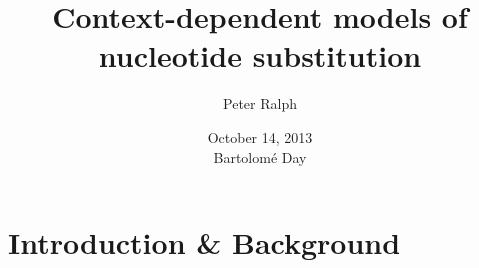 \documentclass[smaller]{beamer}
\title[Context-dependent models] %
{Context-dependent models of nucleotide substitution}
\author %
{Peter Ralph}
\institute[USC]
{
  USC -- Computational Biology and Bioinformatics
  }
\date %
{October 14, 2013\\Bartolom\'e Day}
\begin{document}

\begin{frame}
  \titlepage
\end{frame}


%
%
%


\section{Introduction \& Background}
\end{document}

